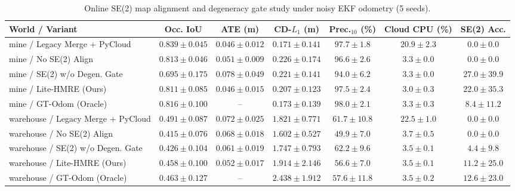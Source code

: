 \begin{table}[t]
\centering
\caption{Online SE(2) map alignment and degeneracy gate study under noisy EKF odometry (5 seeds).}
\label{tab:alignment}
\footnotesize
\begin{tabular}{lcccccc}
\toprule
World / Variant & Occ. IoU & ATE (m) & CD-$L_1$ (m) & Prec.$_{10}$ (\%) & Cloud CPU (\%) & SE(2) Acc. \\
\midrule
mine / Legacy Merge + PyCloud & $\mathbf{0.839 \pm 0.045}$ & $\mathbf{0.046 \pm 0.012}$ & $\mathbf{0.171 \pm 0.141}$ & $97.7 \pm 1.8$ & $20.9 \pm 2.3$ & $0.0 \pm 0.0$ \\
mine / No SE(2) Align & $0.813 \pm 0.046$ & $0.051 \pm 0.009$ & $0.226 \pm 0.174$ & $96.6 \pm 2.6$ & $3.3 \pm 0.0$ & $0.0 \pm 0.0$ \\
mine / SE(2) w/o Degen. Gate & $0.695 \pm 0.175$ & $0.078 \pm 0.049$ & $0.221 \pm 0.141$ & $94.0 \pm 6.2$ & $3.3 \pm 0.0$ & $27.0 \pm 39.9$ \\
mine / Lite-HMRE (Ours) & $0.811 \pm 0.085$ & $0.046 \pm 0.015$ & $0.207 \pm 0.123$ & $97.5 \pm 2.4$ & $\mathbf{3.0 \pm 0.3}$ & $22.0 \pm 35.3$ \\
mine / GT-Odom (Oracle) & $0.816 \pm 0.100$ & -- & $0.173 \pm 0.139$ & $\mathbf{98.0 \pm 2.1}$ & $3.3 \pm 0.3$ & $8.4 \pm 11.2$ \\
\midrule
warehouse / Legacy Merge + PyCloud & $\mathbf{0.491 \pm 0.087}$ & $0.072 \pm 0.025$ & $1.821 \pm 0.771$ & $61.7 \pm 10.8$ & $22.5 \pm 1.0$ & $0.0 \pm 0.0$ \\
warehouse / No SE(2) Align & $0.415 \pm 0.076$ & $0.068 \pm 0.018$ & $\mathbf{1.602 \pm 0.527}$ & $49.9 \pm 7.0$ & $3.7 \pm 0.5$ & $0.0 \pm 0.0$ \\
warehouse / SE(2) w/o Degen. Gate & $0.426 \pm 0.104$ & $0.061 \pm 0.019$ & $1.747 \pm 0.793$ & $\mathbf{62.2 \pm 9.6}$ & $\mathbf{3.5 \pm 0.1}$ & $4.4 \pm 9.8$ \\
warehouse / Lite-HMRE (Ours) & $0.458 \pm 0.100$ & $\mathbf{0.052 \pm 0.017}$ & $1.914 \pm 2.146$ & $56.6 \pm 7.0$ & $3.5 \pm 0.1$ & $11.2 \pm 25.0$ \\
warehouse / GT-Odom (Oracle) & $0.463 \pm 0.127$ & -- & $2.438 \pm 1.912$ & $57.6 \pm 11.8$ & $3.5 \pm 0.2$ & $12.6 \pm 23.0$ \\
\bottomrule
\end{tabular}
\end{table}
